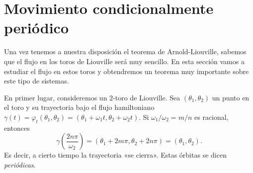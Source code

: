 \section{Movimiento condicionalmente periódico}\label{sec:promedios}
Una vez tenemos a nuestra disposición el teorema de Arnold-Liouville, sabemos que el flujo en los toros de Liouville será muy sencillo. En esta sección vamos a estudiar el flujo en estos toros y obtendremos un teorema muy importante sobre este tipo de sistemas.

  En primer lugar, consideremos un $2$-toro de Liouville. Sea $(\theta_1,\theta_2)$ un punto en el toro y su trayectoria bajo el flujo hamiltoniano $\gamma(t)=\varphi_t(\theta_1,\theta_2)=(\theta_1+\omega_1t,\theta_2+\omega_2t)$. Si $\omega_1/\omega_2=m/n$ es racional, entonces 
  \begin{equation*}
    \gamma\left(\frac{2n\pi}{\omega_2}\right) = (\theta_1+2m\pi,\theta_2+2n\pi)=(\theta_1,\theta_2).
  \end{equation*}
  Es decir, a cierto tiempo la trayectoria «se cierra». Estas órbitas se dicen \emph{periódicas}. 
 
